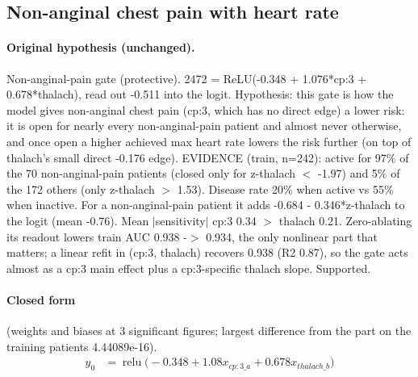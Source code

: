 \documentclass[a4paper,10pt]{article}
\newif\ifreviewmarks
\newcommand{\reviewrule}{\noindent{\color{BrickRed}\rule{\linewidth}{0.8pt}}}
\newenvironment{drafted}[1][]{%
  \ifreviewmarks\par\addvspace{\medskipamount}\reviewrule\par\nopagebreak
  \noindent{\color{BrickRed}\sffamily\footnotesize\textbf{Thesis Draft}\quad #1\hfill review}\par\nopagebreak\smallskip\fi}{%
  \ifreviewmarks\par\smallskip\noindent{\color{BrickRed}\sffamily\footnotesize end of thesis draft}\par\nopagebreak\reviewrule\par\medskip\fi}
\begin{document}
\begin{drafted}[plain-language layer: heart-s2-c3]
\subsection{Non-anginal chest pain with heart rate}\label{tech:ann30}
\paragraph{Original hypothesis (unchanged).} Non-anginal-pain gate (protective). 2472 = ReLU(-0.348 + 1.076*cp:3 + 0.678*thalach), read out -0.511 into the logit. Hypothesis: this gate is how the model gives non-anginal chest pain (cp:3, which has no direct edge) a lower risk: it is open for nearly every non-anginal-pain patient and almost never otherwise, and once open a higher achieved max heart rate lowers the risk further (on top of thalach's small direct -0.176 edge). EVIDENCE (train, n=242): active for 97\% of the 70 non-anginal-pain patients (closed only for z-thalach $<$ -1.97) and 5\% of the 172 others (only z-thalach $>$ 1.53). Disease rate 20\% when active vs 55\% when inactive. For a non-anginal-pain patient it adds -0.684 - 0.346*z-thalach to the logit (mean -0.76). Mean $|$sensitivity$|$ cp:3 0.34 $>$ thalach 0.21. Zero-ablating its readout lowers train AUC 0.938 -$>$ 0.934, the only nonlinear part that matters; a linear refit in (cp:3, thalach) recovers 0.938 (R2 0.87), so the gate acts almost as a cp:3 main effect plus a cp:3-specific thalach slope. Supported.
\paragraph{Closed form} {\footnotesize(weights and biases at 3 significant figures; largest difference from the part on the training patients 4.44089e-16).}
{\small\begingroup\allowdisplaybreaks
\begin{align*}
y_{0} &= \operatorname{relu}\bigl(-0.348 + 1.08 x_{cp:3\_a} + 0.678 x_{thalach\_b}\bigr)
\end{align*}\endgroup}


\end{drafted}
\end{document}
